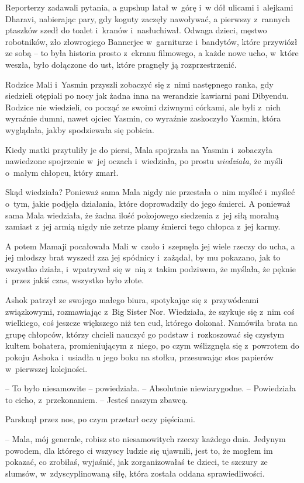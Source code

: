 \documentclass[oneside,polish,11pt,rmheadings]{mwbk}
\begin{document}
Reporterzy zadawali pytania, a gupshup latał w~górę i~w dół ulicami i~alejkami Dharavi, nabierając pary, gdy koguty zaczęły nawoływać, a pierwszy z~rannych ptaszków szedł do toalet i~kranów i~nasłuchiwał. Odwaga dzieci, męstwo robotników, zło złowrogiego Bannerjee w~garniturze i~bandytów, które przywiózł ze sobą -- to była historia prosto z~ekranu filmowego, a każde nowe ucho, w~które weszła, było dołączone do ust, które pragnęły ją rozprzestrzenić.

Rodzice Mali i~Yasmin przyszli zobaczyć się z~nimi następnego ranka, gdy siedzieli otępiali po nocy jak żadna inna na werandzie kawiarni pani Dibyendu. Rodzice nie wiedzieli, co począć ze swoimi dziwnymi córkami, ale byli z~nich wyraźnie dumni, nawet ojciec Yasmin, co wyraźnie zaskoczyło Yasmin, która wyglądała, jakby spodziewała się pobicia.

Kiedy matki przytuliły je do piersi, Mala spojrzała na Yasmin i~zobaczyła nawiedzone spojrzenie w~jej oczach i~wiedziała, po prostu \textit{wiedziała}, że myśli o~małym chłopcu, który zmarł.

Skąd wiedziała? Ponieważ sama Mala nigdy nie przestała o~nim myśleć i~myśleć o~tym, jakie podjęła działania, które doprowadziły do jego śmierci. A ponieważ sama Mala wiedziała, że żadna ilość pokojowego siedzenia z~jej siłą moralną zamiast z~jej armią nigdy nie zetrze plamy śmierci tego chłopca z~jej karmy.

A potem Mamaji pocałowała Mali w~czoło i~szepnęła jej wiele rzeczy do ucha, a jej młodszy brat wyszedł zza jej spódnicy i~zażądał, by mu pokazano, jak to wszystko działa, i~wpatrywał się w~nią z~takim podziwem, że myślała, że pęknie i~przez jakiś czas, wszystko było złote.

Ashok patrzył ze swojego małego biura, spotykając się z~przywódcami związkowymi, rozmawiając z~Big Sister Nor. Wiedziała, że szykuje się z~nim coś wielkiego, coś jeszcze większego niż ten cud, którego dokonał. Namówiła brata na grupę chłopców, którzy chcieli nauczyć go podstaw i~rozkoszować się czystym kultem bohatera, promieniującym z~niego, po czym wślizgnęła się z~powrotem do pokoju Ashoka i~usiadła u jego boku na stołku, przesuwając stos papierów w~pierwszej kolejności.

-- To było niesamowite -- powiedziała. -- Absolutnie niewiarygodne. -- Powiedziała to cicho, z~przekonaniem. -- Jesteś naszym zbawcą. 

Parsknął przez nos, po czym przetarł oczy pięściami. 

-- Mala, mój generale, robisz sto niesamowitych rzeczy każdego dnia. Jedynym powodem, dla którego ci wszyscy ludzie się ujawnili, jest to, że mogłem im pokazać, co zrobiłaś, wyjaśnić, jak zorganizowałaś te dzieci, te szczury ze slumsów, w~zdyscyplinowaną siłę, która została oddana sprawiedliwości.
\end{document}

